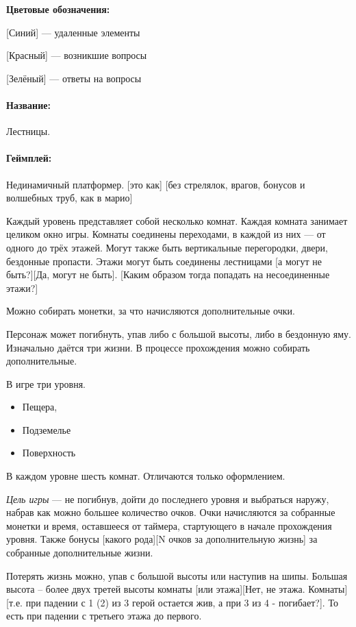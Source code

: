 \documentclass[12pt,a4paper]{article}
\begin{document}
\textbf{Цветовые обозначения:}

{\color{blue} [Синий]} --- удаленные элементы

{\color{red} [Красный]} --- возникшие вопросы

{\color{ForestGreen} [Зелёный]} --- ответы на вопросы

\newcommand{\ans}[1]{{\color{ForestGreen}#1}}

\paragraph{Название:} Лестницы.
\paragraph{Геймплей:} Нединамичный платформер. {\color{red} [это как]} \ans{[без стрелялок, врагов, бонусов и волшебных труб, как в марио]}

Каждый уровень представляет собой несколько комнат. Каждая комната занимает целиком окно игры. Комнаты соединены переходами, в каждой из них --- от одного до трёх этажей. Могут также быть вертикальные перегородки, двери, бездонные пропасти. Этажи могут быть соединены лестницами {\color{red} [а могут не быть?]}\ans{[Да, могут не быть]}. {\color{red} [Каким образом тогда попадать на несоединенные этажи?]}

Можно собирать монетки, за что начисляются дополнительные очки. 

Персонаж может погибнуть, упав либо с большой высоты, либо в бездонную яму. Изначально даётся три жизни. В процессе прохождения можно собирать дополнительные.

В игре три уровня.
\begin{itemize}
\item Пещера,
\item Подземелье
\item Поверхность
\end{itemize}

В каждом уровне шесть комнат. Отличаются только оформлением. 

\textit{Цель игры} --- не погибнув, дойти до последнего уровня и выбраться наружу, набрав как можно большее количество очков. Очки начисляются за собранные монетки и время, оставшееся от таймера, стартующего в начале прохождения уровня. Также бонусы {\color{red} [какого рода]}\ans{[N очков за дополнительную жизнь]} за собранные дополнительные жизни.

Потерять жизнь можно, упав с большой высоты или наступив на шипы. Большая высота -- более двух третей высоты комнаты {\color{red} [или этажа]}\ans{[Нет, не этажа. Комнаты]} {\color{red} [т.е. при падении с 1 (2) из 3 герой остается жив, а при 3 из 4 - погибает?]}. То есть при падении с третьего этажа до первого.
\end{document}
